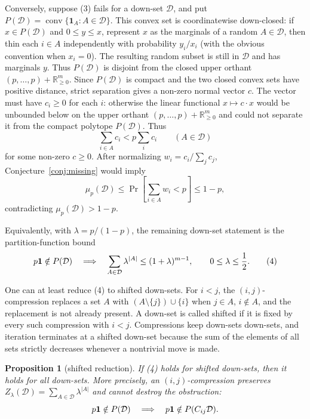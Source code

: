 \documentclass[12pt]{article}
\newtheorem{proposition}{Proposition}
\newcommand{\conv}{\operatorname{conv}}
\begin{document}
Conversely, suppose (3) fails for a down-set \(\mathcal D\), and put
\(P(\mathcal D)=\conv\{\mathbf1_A:A\in\mathcal D\}\).  This convex set is
coordinatewise down-closed: if \(x\in P(\mathcal D)\) and \(0\le y\le x\),
represent \(x\) as the marginals of a random \(A\in\mathcal D\), then thin each
\(i\in A\) independently with probability \(y_i/x_i\) (with the obvious
convention when \(x_i=0\)).  The resulting random subset is still in
\(\mathcal D\) and has marginals \(y\).  Thus \(P(\mathcal D)\) is disjoint
from the closed upper orthant
\((p,\ldots,p)+\mathbb R_{\ge0}^m\).  Since \(P(\mathcal D)\) is compact and
the two closed convex sets have positive distance, strict separation gives a
non-zero normal vector \(c\).  The vector must have \(c_i\ge0\) for
each \(i\): otherwise the linear functional \(x\mapsto c\cdot x\) would be
unbounded below on the upper orthant
\((p,\ldots,p)+\mathbb R_{\ge0}^m\) and could not separate it from the compact
polytope \(P(\mathcal D)\).  Thus
\[
      \sum_{i\in A}c_i < p\sum_i c_i
      \qquad(A\in\mathcal D)
\]
for some non-zero \(c\ge0\).
After normalizing \(w_i=c_i/\sum_jc_j\), Conjecture~\ref{conj:missing} would imply
\[
 \mu_p(\mathcal D)
 \le \Pr\!\left[\sum_{i\in A}w_i<p\right]\le1-p,
\]
contradicting \(\mu_p(\mathcal D)>1-p\).

Equivalently, with \(\lambda=p/(1-p)\), the remaining down-set statement is
the partition-function bound
\[
 p{\bf 1}\notin P(\mathcal D)
 \quad\Longrightarrow\quad
 \sum_{A\in\mathcal D}\lambda^{|A|}
 \le (1+\lambda)^{m-1},
 \qquad 0\le\lambda\le\frac12 .                         \tag{4}
\]

One can at least reduce (4) to shifted down-sets.  For \(i<j\), the
\((i,j)\)-compression replaces a set \(A\) with
\((A\setminus\{j\})\cup\{i\}\) when \(j\in A\), \(i\notin A\), and the
replacement is not already present.  A down-set is called shifted if it is fixed
by every such compression with \(i<j\).  Compressions keep down-sets down-sets,
and iteration terminates at a shifted down-set because the sum of the elements
of all sets strictly decreases whenever a nontrivial move is made.

\begin{proposition}[shifted reduction]\label{prop:shifted}
If (4) holds for shifted down-sets, then it holds for all down-sets.
More precisely, an \((i,j)\)-compression preserves
\(Z_\lambda(\mathcal D)=\sum_{A\in\mathcal D}\lambda^{|A|}\) and cannot destroy
the obstruction:
\[
        p{\bf1}\notin P(\mathcal D)\quad\Longrightarrow\quad
        p{\bf1}\notin P(C_{ij}\mathcal D).
\]
\end{proposition}
\end{document}
